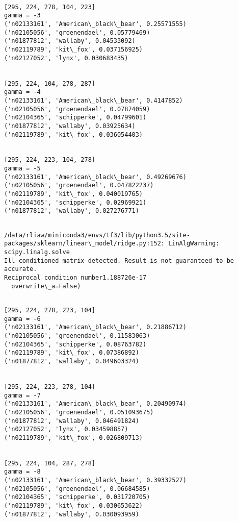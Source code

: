 \documentclass[11pt]{article}
\begin{document}
    \begin{Verbatim}[commandchars=\\\{\}]

[295, 224, 278, 104, 223]
gamma = -3
('n02133161', 'American\_black\_bear', 0.25571555)
('n02105056', 'groenendael', 0.05779469)
('n01877812', 'wallaby', 0.04533092)
('n02119789', 'kit\_fox', 0.037156925)
('n02127052', 'lynx', 0.030683435)


[295, 224, 104, 278, 287]
gamma = -4
('n02133161', 'American\_black\_bear', 0.4147852)
('n02105056', 'groenendael', 0.07874059)
('n02104365', 'schipperke', 0.04799601)
('n01877812', 'wallaby', 0.03925634)
('n02119789', 'kit\_fox', 0.036054403)


[295, 224, 223, 104, 278]
gamma = -5
('n02133161', 'American\_black\_bear', 0.49269676)
('n02105056', 'groenendael', 0.047822237)
('n02119789', 'kit\_fox', 0.040019765)
('n02104365', 'schipperke', 0.02969921)
('n01877812', 'wallaby', 0.027276771)


    \end{Verbatim}

    \begin{Verbatim}[commandchars=\\\{\}]
/data/rliaw/miniconda3/envs/tf3/lib/python3.5/site-packages/sklearn/linear\_model/ridge.py:152: LinAlgWarning: scipy.linalg.solve
Ill-conditioned matrix detected. Result is not guaranteed to be accurate.
Reciprocal condition number1.188726e-17
  overwrite\_a=False)

    \end{Verbatim}

    \begin{Verbatim}[commandchars=\\\{\}]

[295, 224, 278, 223, 104]
gamma = -6
('n02133161', 'American\_black\_bear', 0.21886712)
('n02105056', 'groenendael', 0.11583063)
('n02104365', 'schipperke', 0.08763782)
('n02119789', 'kit\_fox', 0.07386892)
('n01877812', 'wallaby', 0.049603324)


[295, 224, 223, 278, 104]
gamma = -7
('n02133161', 'American\_black\_bear', 0.20490974)
('n02105056', 'groenendael', 0.051093675)
('n01877812', 'wallaby', 0.046491824)
('n02127052', 'lynx', 0.034598857)
('n02119789', 'kit\_fox', 0.026809713)


[295, 224, 104, 287, 278]
gamma = -8
('n02133161', 'American\_black\_bear', 0.39332527)
('n02105056', 'groenendael', 0.06684585)
('n02104365', 'schipperke', 0.031720705)
('n02119789', 'kit\_fox', 0.030653622)
('n01877812', 'wallaby', 0.030093959)


    \end{Verbatim}
\end{document}
